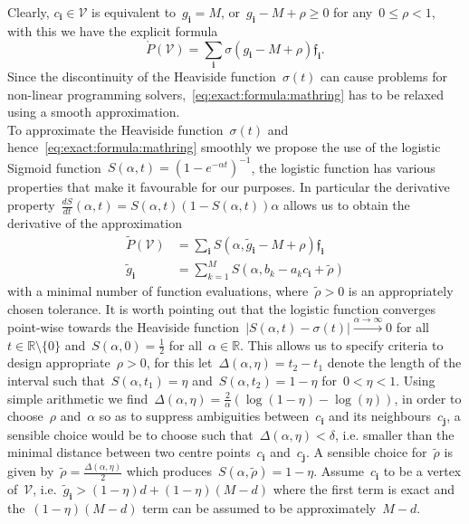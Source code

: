 \documentclass[letterpaper, 10pt, conference]{ieeeconf} %
\providecommand{\abs}[1]{\left\lvert#1\right\rvert}
\providecommand{\bfa}[1]{\mathbf{#1}}
\begin{document}
%
Clearly, $c_\bfa{i}\in\mathcal V$ is equivalent to~$g_\bfa{i}=M$, or~$g_\bfa{i}-M+\rho\geq0$ for any~$0\leq\rho<1$, with this we have the explicit formula
%
\begin{equation}\label{eq:exact:formula:mathring}
	\mathring{P}(\mathcal V) = \sum_{\bfa{i}}\sigma(g_\bfa{i}-M+\rho)\mathfrak f_\bfa{i}.
\end{equation}
%
Since the discontinuity of the Heaviside function~$\sigma(t)$ can cause problems for non-linear programming solvers,~\eqref{eq:exact:formula:mathring} has to be relaxed using a smooth approximation.
%
\\[1em]
%
To approximate the Heaviside function~$\sigma(t)$ and hence~\eqref{eq:exact:formula:mathring} smoothly we propose the use of the logistic Sigmoid function~$S(\alpha,t) = (1-e^{-\alpha t})^{-1}$, the logistic function has various properties that make it favourable for our purposes.
%
In particular the derivative property~$\frac{dS}{dt}(\alpha,t)=S(\alpha,t)(1-S(\alpha,t))\alpha$ allows us to obtain the derivative of the approximation
%
\[
\begin{aligned}
\tilde{P}(\mathcal V) &= \sum_\bfa{i}S(\alpha,\tilde g_\bfa{i}-M+\rho)\mathfrak f_\bfa{i}\\
\tilde g_\bfa{i} &= \sum_{k=1}^M S(\alpha,b_k-a_k c_\bfa{i}+\tilde\rho)
\end{aligned}
\]
%
with a minimal number of function evaluations, where~$\tilde\rho>0$ is an appropriately chosen tolerance.
%
It is worth pointing out that the logistic function converges point-wise towards the Heaviside function~$\abs{S(\alpha,t)-\sigma(t)}\xrightarrow{\alpha\rightarrow\infty}0$ for all~$t\in\mathbb R\setminus\{0\}$ and~$S(\alpha,0)=\frac{1}{2}$ for all~$\alpha\in\mathbb R$.
%
This allows us to specify criteria to design appropriate~$\rho>0$, for this let~$\Delta(\alpha,\eta)=t_2-t_1$ denote the length of the interval such that~$S(\alpha,t_1)=\eta$ and~$S(\alpha,t_2)=1-\eta$ for~$0<\eta<1$.
%
Using simple arithmetic we find~$\Delta(\alpha,\eta)=\frac{2}{\alpha}(\log(1-\eta)-\log(\eta))$, in order to choose~$\rho$ and~$\alpha$ so as to suppress ambiguities between~$c_\bfa{i}$ and its neighbours~$c_\bfa{j}$, a sensible choice would be to choose such that~$\Delta(\alpha,\eta)<\delta$, i.e. smaller than the minimal distance between two centre points~$c_\bfa{i}$ and~$c_\bfa{j}$. 
%
A sensible choice for~$\tilde\rho$ is given by~$\tilde\rho=\frac{\Delta(\alpha,\eta)}{2}$ which produces~$S(\alpha,\tilde\rho)=1-\eta$.
%
Assume~$c_\bfa{i}$ to be a vertex of~$\mathcal V$, i.e.~$\tilde g_\bfa{i}>(1-\eta)d+(1-\eta)(M-d)$ where the first term is exact and the~$(1-\eta)(M-d)$ term can be assumed to be approximately~$M-d$.
\end{document}
